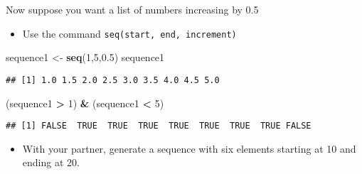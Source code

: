 \documentclass[ignorenonframetext,]{beamer}
\newenvironment{Shaded}{\begin{snugshade}}{\end{snugshade}}
\newcommand{\KeywordTok}[1]{\textcolor[rgb]{0.13,0.29,0.53}{\textbf{#1}}}
\newcommand{\DecValTok}[1]{\textcolor[rgb]{0.00,0.00,0.81}{#1}}
\newcommand{\FloatTok}[1]{\textcolor[rgb]{0.00,0.00,0.81}{#1}}
\newcommand{\StringTok}[1]{\textcolor[rgb]{0.31,0.60,0.02}{#1}}
\newcommand{\OperatorTok}[1]{\textcolor[rgb]{0.81,0.36,0.00}{\textbf{#1}}}
\newcommand{\NormalTok}[1]{#1}
\providecommand{\tightlist}{%
	\setlength{\itemsep}{0pt}\setlength{\parskip}{0pt}}
\begin{document}
\begin{frame}[fragile]{Now suppose you want a list of numbers increasing
by 0.5}

\begin{itemize}
\tightlist
\item
  Use the command \texttt{seq(start,\ end,\ increment)}
\end{itemize}

\begin{Shaded}
\begin{Highlighting}[]
\NormalTok{sequence1 <-}\StringTok{ }\KeywordTok{seq}\NormalTok{(}\DecValTok{1}\NormalTok{,}\DecValTok{5}\NormalTok{,}\FloatTok{0.5}\NormalTok{)}
\NormalTok{sequence1}
\end{Highlighting}
\end{Shaded}

\begin{verbatim}
## [1] 1.0 1.5 2.0 2.5 3.0 3.5 4.0 4.5 5.0
\end{verbatim}

\begin{Shaded}
\begin{Highlighting}[]
\NormalTok{(sequence1 }\OperatorTok{>}\StringTok{ }\DecValTok{1}\NormalTok{) }\OperatorTok{&}\StringTok{ }\NormalTok{(sequence1 }\OperatorTok{<}\StringTok{ }\DecValTok{5}\NormalTok{)}
\end{Highlighting}
\end{Shaded}

\begin{verbatim}
## [1] FALSE  TRUE  TRUE  TRUE  TRUE  TRUE  TRUE  TRUE FALSE
\end{verbatim}

\begin{itemize}
\tightlist
\item
  With your partner, generate a sequence with six elements starting at
  10 and ending at 20.
\end{itemize}

\end{frame}
\end{document}
